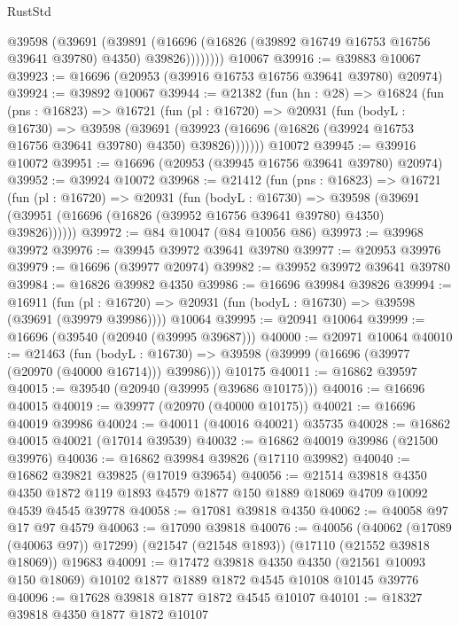 \begin{lexlean}{RustStd}
\begin{coremodule}
            @39598
              (@39691
                (@39891
                  (@16696 (@16826 (@39892 @16749 @16753 @16756 @39641 @39780) @4350) @39826))))))))
    @10067
@39916 := @39883 @10067
@39923 := @16696 (@20953 (@39916 @16753 @16756 @39641 @39780) @20974)
@39924 := @39892 @10067
@39944 := @21382
    (fun (hn : @28) =>
    @16824
      (fun (pns : @16823) =>
      @16721
        (fun (pl : @16720) =>
        @20931
          (fun (bodyL : @16730) =>
          @39598
            (@39691
              (@39923 (@16696 (@16826 (@39924 @16753 @16756 @39641 @39780) @4350) @39826)))))))
    @10072
@39945 := @39916 @10072
@39951 := @16696 (@20953 (@39945 @16756 @39641 @39780) @20974)
@39952 := @39924 @10072
@39968 := @21412
    (fun (pns : @16823) =>
    @16721
      (fun (pl : @16720) =>
      @20931
        (fun (bodyL : @16730) =>
        @39598 (@39691 (@39951 (@16696 (@16826 (@39952 @16756 @39641 @39780) @4350) @39826))))))
@39972 := @84 @10047 (@84 @10056 @86)
@39973 := @39968 @39972
@39976 := @39945 @39972 @39641 @39780
@39977 := @20953 @39976
@39979 := @16696 (@39977 @20974)
@39982 := @39952 @39972 @39641 @39780
@39984 := @16826 @39982 @4350
@39986 := @16696 @39984 @39826
@39994 := @16911
    (fun (pl : @16720) => @20931 (fun (bodyL : @16730) => @39598 (@39691 (@39979 @39986))))
    @10064
@39995 := @20941 @10064
@39999 := @16696 (@39540 (@20940 (@39995 @39687)))
@40000 := @20971 @10064
@40010 := @21463
    (fun (bodyL : @16730) => @39598 (@39999 (@16696 (@39977 (@20970 (@40000 @16714))) @39986)))
    @10175
@40011 := @16862 @39597
@40015 := @39540 (@20940 (@39995 (@39686 @10175)))
@40016 := @16696 @40015
@40019 := @39977 (@20970 (@40000 @10175))
@40021 := @16696 @40019 @39986
@40024 := @40011 (@40016 @40021) @35735
@40028 := @16862 @40015 @40021 (@17014 @39539)
@40032 := @16862 @40019 @39986 (@21500 @39976)
@40036 := @16862 @39984 @39826 (@17110 @39982)
@40040 := @16862 @39821 @39825 (@17019 @39654)
@40056 := @21514
    @39818
    @4350
    @4350
    @1872
    @119
    @1893
    @4579
    @1877
    @150
    @1889
    @18069
    @4709
    @10092
    @4539
    @4545
    @39778
@40058 := @17081 @39818 @4350
@40062 := @40058 @97 @17 @97 @4579
@40063 := @17090 @39818
@40076 := @40056
    (@40062 (@17089 (@40063 @97)) @17299)
    (@21547 (@21548 @1893))
    (@17110 (@21552 @39818 @18069))
    @19683
@40091 := @17472
    @39818
    @4350
    @4350
    (@21561 @10093 @150 @18069)
    @10102
    @1877
    @1889
    @1872
    @4545
    @10108
    @10145
    @39776
@40096 := @17628 @39818 @1877 @1872 @4545 @10107
@40101 := @18327 @39818 @4350 @1877 @1872 @10107

\end{coremodule}
\end{lexlean}
